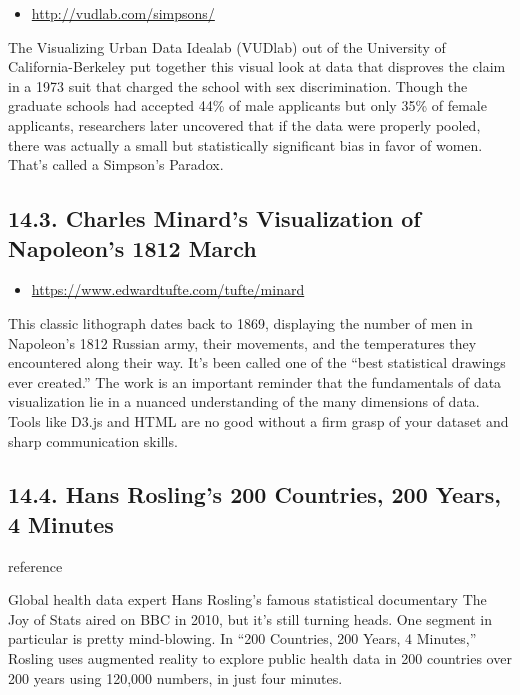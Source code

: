 \documentclass[]{book}
\providecommand{\tightlist}{%
  \setlength{\itemsep}{0pt}\setlength{\parskip}{0pt}}
\theoremstyle{definition}
\theoremstyle{definition}
\theoremstyle{definition}
\theoremstyle{remark}
\begin{document}
\begin{itemize}
\tightlist
\item
  \url{http://vudlab.com/simpsons/}
\end{itemize}

The Visualizing Urban Data Idealab (VUDlab) out of the University of
California-Berkeley put together this visual look at data that disproves
the claim in a 1973 suit that charged the school with sex
discrimination. Though the graduate schools had accepted 44\% of male
applicants but only 35\% of female applicants, researchers later
uncovered that if the data were properly pooled, there was actually a
small but statistically significant bias in favor of women. That's
called a Simpson's Paradox.

\subsection{14.3. Charles Minard's Visualization of Napoleon's 1812
March}\label{charles-minards-visualization-of-napoleons-1812-march}

\begin{itemize}
\tightlist
\item
  \url{https://www.edwardtufte.com/tufte/minard}
\end{itemize}

This classic lithograph dates back to 1869, displaying the number of men
in Napoleon's 1812 Russian army, their movements, and the temperatures
they encountered along their way. It's been called one of the ``best
statistical drawings ever created.'' The work is an important reminder
that the fundamentals of data visualization lie in a nuanced
understanding of the many dimensions of data. Tools like D3.js and HTML
are no good without a firm grasp of your dataset and sharp communication
skills.

\subsection{14.4. Hans Rosling's 200 Countries, 200 Years, 4
Minutes}\label{hans-roslings-200-countries-200-years-4-minutes}

reference\citep{hans_rosling}

Global health data expert Hans Rosling's famous statistical documentary
The Joy of Stats aired on BBC in 2010, but it's still turning heads. One
segment in particular is pretty mind-blowing. In ``200 Countries, 200
Years, 4 Minutes,'' Rosling uses augmented reality to explore public
health data in 200 countries over 200 years using 120,000 numbers, in
just four minutes.
\end{document}
